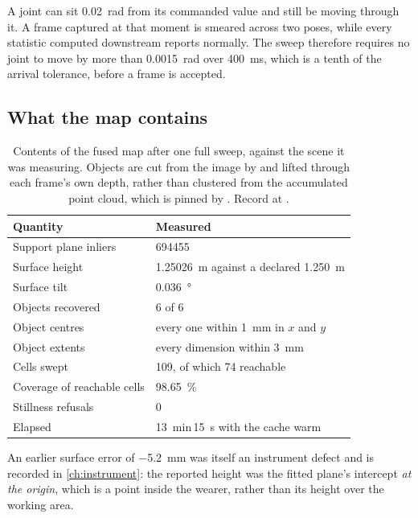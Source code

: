 A joint can sit \SI{0.02}{\radian} from its commanded value and still be
moving through it. A frame captured at that moment is smeared across two
poses, while every statistic computed downstream reports normally. The sweep
therefore requires no joint to move by more than \SI{0.0015}{\radian} over
\SI{400}{\milli\second}, which is a tenth of the arrival tolerance, before a
frame is accepted.

\subsection{What the map contains}

\begin{table}[htbp]
  \centering
  \caption[Measured map accuracy]{Contents of the fused map after one full
  sweep, against the scene it was measuring. Objects are cut from the image by
   and lifted through each frame's own depth, rather than
  clustered from the accumulated point cloud, which is pinned by
  . Record at
  .}
  \label{tab:map}
  \begin{tabular}{@{}ll@{}}
    \toprule
    Quantity & Measured \\
    \midrule
    Support plane inliers & \num{694455} \\
    Surface height & \SI{1.25026}{\metre} against a declared \SI{1.250}{\metre} \\
    Surface tilt & \SI{0.036}{\degree} \\
    Objects recovered & 6 of 6 \\
    Object centres & every one within \SI{1}{\milli\metre} in $x$ and $y$ \\
    Object extents & every dimension within \SI{3}{\milli\metre} \\
    Cells swept & 109, of which 74 reachable \\
    Coverage of reachable cells & \SI{98.65}{\percent} \\
    Stillness refusals & 0 \\
    Elapsed & \SI{13}{\minute}\,\SI{15}{\second} with the cache warm \\
    \bottomrule
  \end{tabular}
\end{table}

An earlier surface error of \SI{-5.2}{\milli\metre} was itself an instrument
defect and is recorded in \cref{ch:instrument}: the reported height was the
fitted plane's intercept \emph{at the origin}, which is a point inside the
wearer, rather than its height over the working area.

